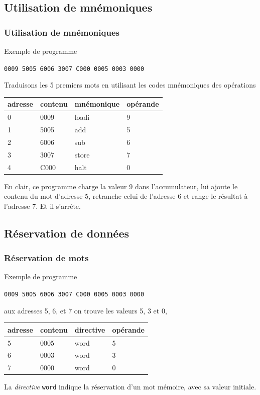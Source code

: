 \subsection{Utilisation de mnémoniques}
\begin{frame}
\frametitle{Utilisation de mnémoniques}
  
\begin{block}{Exemple de programme}
  
\texttt{0009 5005 6006 3007 C000 0005 0003 0000}
\end{block}

Traduisons les 5 premiers mots en utilisant les \alert{codes mnémoniques} des opérations
\begin{center}
\begin{tabular}{ll|ll}
adresse & contenu & \alert{mnémonique} & opérande \\
\hline
0  & 0009 & loadi & 9 \\
1 & 5005 & add & 5 \\
2 & 6006 & sub & 6 \\
3 &  3007 & store & 7 \\
4 &  C000 & halt & 0 
\end{tabular}
\end{center}


En clair, ce programme charge la valeur 9 dans l'accumulateur, lui ajoute le contenu du
mot d'adresse 5, retranche celui de l'adresse 6 et range le résultat à
l'adresse 7. Et il s'arrête.
\end{frame}

\subsection{Réservation de données}
\begin{frame}
\frametitle{Réservation de mots}

\begin{block}{Exemple de programme}
  
\texttt{0009 5005 6006 3007 C000 0005 0003 0000}
\end{block}

 aux adresses 5, 6, et 7 on trouve les \alert{valeurs} 5,
3 et 0, 
\begin{center}
\begin{tabular}{ll|ll}
adresse & contenu & \alert{directive} & opérande \\
\hline
5  & 0005 & word & 5 \\
6  & 0003 & word & 3 \\
7  & 0000 & word & 0 
\end{tabular}
\end{center}
 
La \emph{directive} \texttt{word} indique la réservation d'un mot mémoire,
avec sa valeur initiale.
\end{frame}


